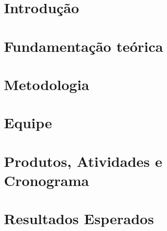 \section{Introdução} %
\label{sec:introdu_o}
 

\section{Fundamentação teórica} %
\label{sec:fundamenta_o_te_rica}
 

\section{Metodologia} %
\label{sec:metodologia}
 

\section{Equipe} %
\label{sec:equipe}


\section{Produtos, Atividades e Cronograma} %
\label{sec:produtos_atividades_e_cronograma}


\section{Resultados Esperados} %
\label{sec:resultados_esperados}

